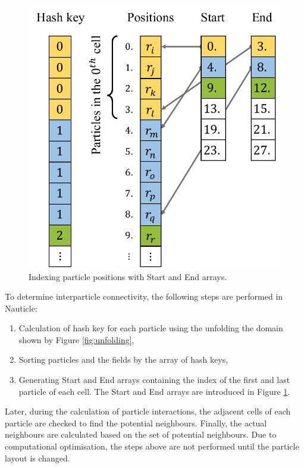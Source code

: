 \documentclass[a4paper,12pt,openany]{book}
\theoremstyle{break}
\begin{document}
\begin{figure}[h!]
  \includegraphics[scale=0.6]{nnsearch.pdf}
  \centering
  \caption{Indexing particle positions with Start and End arrays.}
  \label{fig:nnsearch}
\end{figure}\vspace*{3pt}
To determine interparticle connectivity, the following steps are performed in Nauticle:
\begin{enumerate}
  \item Calculation of hash key for each particle using the unfolding the domain shown by Figure \ref{fig:unfolding},
  \item Sorting particles and the fields by the array of hash keys,
  \item Generating Start and End arrays containing the index of the first and last particle of each cell. The Start and End arrays are introduced in Figure \ref{fig:nnsearch}.
\end{enumerate}
Later, during the calculation of particle interactions, the adjacent cells of each particle are checked to find the potential neighbours. Finally, the actual neighbours are calculated based on the set of potential neighbours. Due to computational optimisation, the steps above are not performed until the particle layout is changed.
\end{document}
